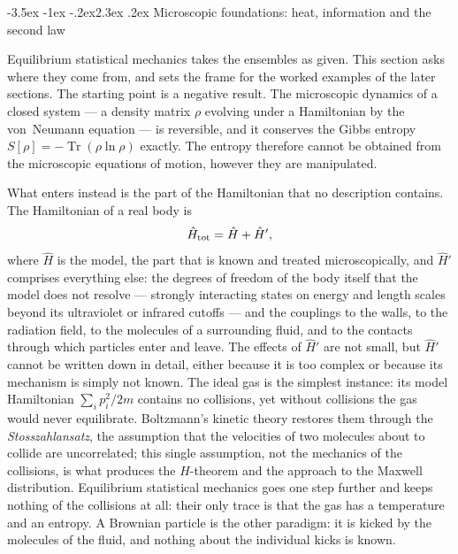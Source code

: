 \documentclass[10pt,a4paper]{article}
\makeatletter
\renewcommand{\section}{\@startsection{section}{1}{\z@}%
  {-3.5ex \@plus -1ex \@minus -.2ex}{2.3ex \@plus .2ex}%
  {\normalfont\fontsize{18pt}{22pt}\selectfont\bfseries}}
\newcommand{\Tr}{\operatorname{Tr}}
\makeatother
\begin{document}
\section{Microscopic foundations: heat, information and the second law}
\label{sec:foundations}

Equilibrium statistical mechanics takes the ensembles as given.
This section asks where they come from, and sets the frame for the worked examples of the later sections.
The starting point is a negative result.
The microscopic dynamics of a closed system --- a density matrix $ \rho $ evolving under a Hamiltonian by the von~Neumann equation --- is reversible, and it conserves the Gibbs entropy $ S[\rho] = -\Tr(\rho\ln\rho) $ exactly.
The entropy therefore cannot be obtained from the microscopic equations of motion, however they are manipulated.

What enters instead is the part of the Hamiltonian that no description contains.
The Hamiltonian of a real body is
\[
  \hat H_{\rm tot} = \hat H + \hat H' ,
\]
where $ \hat H $ is the model, the part that is known and treated microscopically, and $ \hat H' $ comprises everything else: the degrees of freedom of the body itself that the model does not resolve --- strongly interacting states on energy and length scales beyond its ultraviolet or infrared cutoffs --- and the couplings to the walls, to the radiation field, to the molecules of a surrounding fluid, and to the contacts through which particles enter and leave.
The effects of $ \hat H' $ are not small, but $ \hat H' $ cannot be written down in detail, either because it is too complex or because its mechanism is simply not known.
The ideal gas is the simplest instance: its model Hamiltonian $ \sum_ip_i^{2}/2m $ contains no collisions, yet without collisions the gas would never equilibrate.
Boltzmann's kinetic theory restores them through the \emph{Stosszahlansatz}, the assumption that the velocities of two molecules about to collide are uncorrelated; this single assumption, not the mechanics of the collisions, is what produces the $ H $-theorem and the approach to the Maxwell distribution.
Equilibrium statistical mechanics goes one step further and keeps nothing of the collisions at all: their only trace is that the gas has a temperature and an entropy.
A Brownian particle is the other paradigm: it is kicked by the molecules of the fluid, and nothing about the individual kicks is known.
\end{document}
